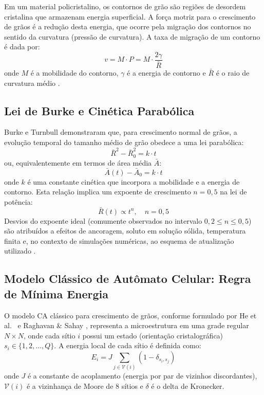\documentclass[12pt,a4paper]{article}
\begin{document}
Em um material policristalino, os contornos de grão são regiões de desordem cristalina
que armazenam energia superficial. A força motriz para o crescimento de grãos é a
redução desta energia, que ocorre pela migração dos contornos no sentido da curvatura
(pressão de curvatura). A taxa de migração de um contorno é dada por:
\begin{equation}
    v = M \cdot P = M \cdot \frac{2\gamma}{\bar{R}}
    \label{eq:vMP}
\end{equation}
onde $M$ é a mobilidade do contorno, $\gamma$ é a energia de contorno e $\bar{R}$ é
o raio de curvatura médio \cite{humphreys2004}.

\subsection{Lei de Burke e Cinética Parabólica}

Burke e Turnbull \cite{burke1952} demonstraram que, para crescimento normal de grãos,
a evolução temporal do tamanho médio de grão obedece a uma lei parabólica:
\begin{equation}
    \bar{R}^2 - \bar{R}_0^2 = k \cdot t
\end{equation}
ou, equivalentemente em termos de área média $\bar{A}$:
\begin{equation}
    \bar{A}(t) - \bar{A}_0 = k \cdot t
    \label{eq:burke}
\end{equation}
onde $k$ é uma constante cinética que incorpora a mobilidade e a energia de contorno.
Esta relação implica um expoente de crescimento $n = 0{,}5$ na lei de potência:
\begin{equation}
    \bar{R}(t) \propto t^n, \quad n = 0{,}5
\end{equation}
Desvios do expoente ideal (comumente observados no intervalo $0{,}2 \leq n \leq 0{,}5$)
são atribuídos a efeitos de ancoragem, soluto em solução sólida, temperatura finita e,
no contexto de simulações numéricas, ao esquema de atualização utilizado
\cite{humphreys2004, raghavan2007}.

\subsection{Modelo Clássico de Autômato Celular: Regra de Mínima Energia}

O modelo CA clássico para crescimento de grãos, conforme formulado por He et al.\
\cite{he2006} e Raghavan \& Sahay \cite{raghavan2007}, representa a microestrutura em
uma grade regular $N \times N$, onde cada sítio $i$ possui um estado (orientação
cristalográfica) $s_i \in \{1, 2, \ldots, Q\}$. A energia local de cada sítio é
definida como:
\begin{equation}
    E_i = J \sum_{j \in \mathcal{V}(i)} (1 - \delta_{s_i, s_j})
\end{equation}
onde $J$ é a constante de acoplamento (energia por par de vizinhos discordantes),
$\mathcal{V}(i)$ é a vizinhança de Moore de 8 sítios e $\delta$ é o delta de Kronecker.
\end{document}
